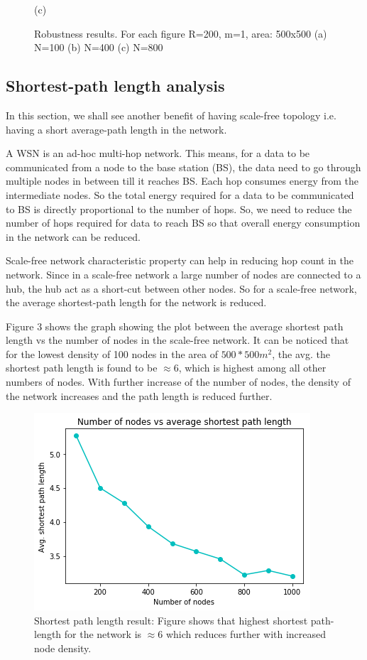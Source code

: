 \documentclass{article}
\begin{document}
\begin{figure}[!htb]
		\begin{center}
			(c)
		\end{center}
		\endminipage
		\caption{Robustness results. For each figure R=200, m=1, area: 500x500 (a) N=100 (b) N=400 (c) N=800}
	\end{figure}
	
	\subsection{Shortest-path length analysis}
	In this section, we shall see another benefit of having scale-free topology i.e. having a short average-path length in the network. 
	
	A WSN is an ad-hoc multi-hop network. This means, for a data to be communicated from a node to the base station (BS), the data need to go through multiple nodes in between till it reaches BS. Each hop consumes energy from the intermediate nodes. So the total energy required for a data to be communicated to BS is directly proportional to the number of hops. So, we need to reduce the number of hops required for data to reach BS so that overall energy consumption in the network can be reduced.
	
	Scale-free network characteristic property can help in reducing hop count in the network. Since in a scale-free network a large number of nodes are connected to a hub, the hub act as a short-cut between other nodes. So for a scale-free network, the average shortest-path length for the network is reduced.
	
	Figure 3 shows the graph showing the plot between the average shortest path length vs the number of nodes in the scale-free network. It can be noticed that for the lowest density of 100 nodes in the area of $500*500 m^2$, the avg. the shortest path length is found to be $\approx 6$, which is highest among all other numbers of nodes. With further increase of the number of nodes, the density of the network increases and the path length is reduced further.  
	
	\begin{figure}
		\begin{center}
			\includegraphics[width=0.5\linewidth]{Results/np.png}
			\caption{Shortest path length result: Figure shows that highest shortest path-length for the network is $\approx 6$ which reduces further with increased node density.}
		\end{center}
	\end{figure}
	
\end{document}

